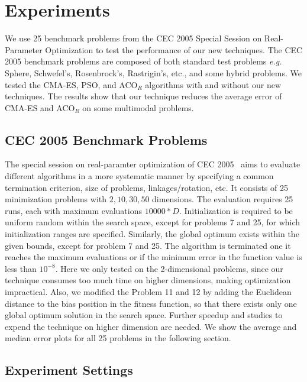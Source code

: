 \chapter{Experiments}
\label{chapter:experiments}

We use 25 benchmark problems from the CEC 2005 Special Session on Real-Parameter Optimization to test the performance of our new techniques.
The CEC 2005 benchmark problems are composed of both standard test problems \textit{e.g.} Sphere, Schwefel's, Rosenbrock's, Rastrigin's, etc.,
and some hybrid problems.
We tested the CMA-ES, PSO, and ACO$_R$ algorithms with and without our new techniques.
The results show that our technique reduces the average error of CMA-ES and ACO$_R$ on some multimodal problems.  

\section{CEC 2005 Benchmark Problems}

The special session on real-paramter optimization of CEC 2005~\cite{Suganthan:2005:benchmark} aims to evaluate different algorithms in a more systematic manner by specifying a common termination criterion, size of problems, linkages/rotation, etc.
It consists of 25 minimization problems with $2, 10, 30, 50$ dimensions.
The evaluation requires 25 runs, each with maximum evaluations $10000 * D$. 
Initialization is required to be uniform random within the search space, except for problems 7 and 25, for which initialization ranges are specified.
Similarly, the global optimum exists within the given bounds, except for problem 7 and 25.
The algorithm is terminated one it reaches the maximum evaluations or if the minimum error in the function value is less than $10^{-8}$.
Here we only tested on the 2-dimensional problems, 
since our technique consumes too much time on higher dimensions, 
making optimization impractical.  
Also, we modified the Problem 11 and 12 by adding the Euclidean distance to the bias position in the fitness function,
so that there exists only one global optimum solution in the search space.
Further speedup and studies to expend the technique on higher dimension are needed.
We show the average and median error plots for all 25 problems in the following section.


\section{Experiment Settings}

